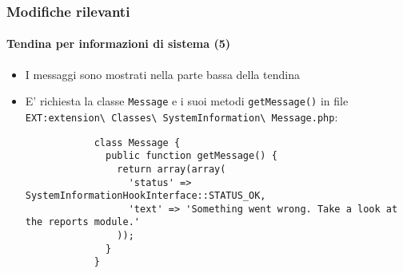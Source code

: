 \begin{frame}[fragile]
	\frametitle{Modifiche rilevanti}
	\framesubtitle{Tendina per informazioni di sistema (5)}

	\lstset{basicstyle=\tiny\ttfamily}

	\begin{itemize}

		\item I messaggi sono mostrati nella parte bassa della tendina

		\item E' richiesta la classe \texttt{Message} e i suoi metodi \texttt{getMessage()} in file
			\small
				\texttt{EXT:extension\textbackslash
					Classes\textbackslash
					SystemInformation\textbackslash
					Message.php}:
			\normalsize

		\begin{lstlisting}
			class Message {
			  public function getMessage() {
			    return array(array(
			      'status' => SystemInformationHookInterface::STATUS_OK,
			      'text' => 'Something went wrong. Take a look at the reports module.'
			    ));
			  }
			}
		\end{lstlisting}

	\end{itemize}

\end{frame}


